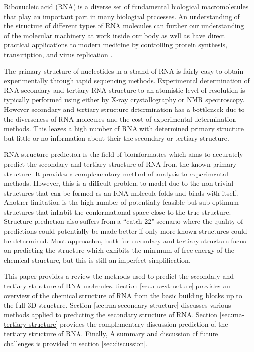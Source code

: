 \documentclass[journal]{IEEEtran}
\begin{document}
Ribonucleic acid (RNA) is a diverse set of fundamental biological macromolecules that play an important part in many biological processes. An understanding of the structure of different types of RNA molecules can further our understanding of the molecular machinery at work inside our body as well as have direct practical applications to modern medicine by controlling protein synthesis, transcription, and virus replication \cite{schlick2010molecular}.

The primary structure of nucleotides in a strand of RNA is fairly easy to obtain experimentally through rapid sequencing methods. Experimental determination of RNA secondary and tertiary RNA structure to an atomistic level of resolution is typically performed using either by X-ray crystallography or NMR spectroscopy. However secondary and tertiary structure determination has a bottleneck due to the diverseness of RNA molecules and the cost of experimental determination methods\cite{ya2014rna}. This leaves a high number of RNA with determined primary structure but little or no information about their the secondary or tertiary structure.

RNA structure prediction is the field of bioinformatics which aims to accurately predict the secondary and tertiary structure of RNA from the known primary structure. It provides a complementary method of analysis to experimental methods. However, this is a difficult problem to model due to the non-trivial structures that can be formed as an RNA molecule folds and binds with itself. Another limitation is the high number of potentially feasible but sub-optimum structures that inhabit the conformational space close to the true structure. Structure prediction also suffers from a ``catch-22'' scenario where the quality of predictions could potentially be made better if only more known structures could be determined. Most approaches, both for secondary and tertiary structure focus on predicting the structure which exhibits the minimum of free energy of the chemical structure, but this is still an imperfect simplification.

This paper provides a review the methods used to predict the secondary and tertiary structure of RNA molecules. Section \ref{sec:rna-structure} provides an overview of the chemical structure of RNA from the basic building blocks up to the full 3D structure. Section \ref{sec:rna-secondary-structure} discusses various methods applied to predicting the secondary structure of RNA. Section \ref{sec:rna-tertiary-structure} provides the complementary discussion prediction of the tertiary structure of RNA. Finally, A summary and discussion of future challenges is provided in section \ref{sec:discussion}.
\end{document}
